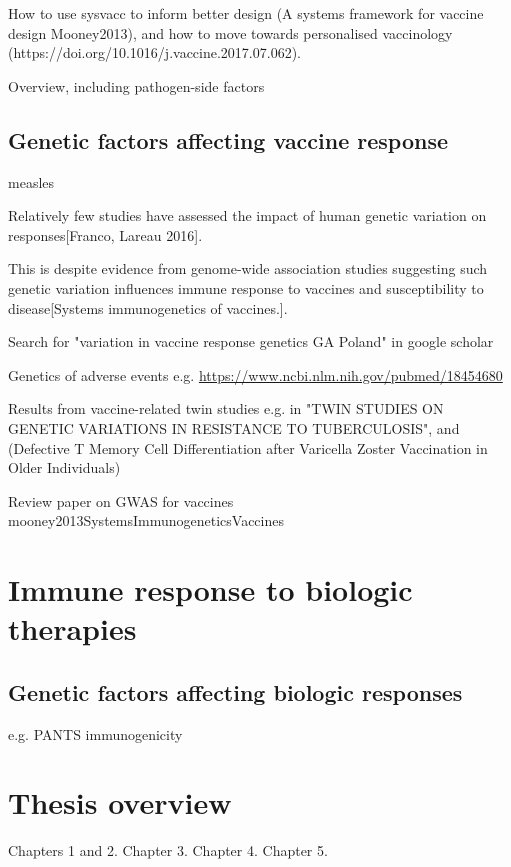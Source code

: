 How to use sysvacc to inform better design (A systems framework for vaccine design Mooney2013), and how to move towards personalised vaccinology (https://doi.org/10.1016/j.vaccine.2017.07.062).

Overview, including pathogen-side factors

\subsection{Genetic factors affecting vaccine response}


measles

Relatively few studies have assessed the impact of human genetic variation on responses[Franco, Lareau 2016].

This is despite evidence from genome-wide association studies suggesting such genetic variation influences immune response to vaccines and susceptibility to disease[Systems immunogenetics of vaccines.].

Search for "variation in vaccine response genetics GA Poland" in google scholar

Genetics of adverse events e.g. \url{https://www.ncbi.nlm.nih.gov/pubmed/18454680}

Results from vaccine-related twin studies e.g. in "TWIN STUDIES ON GENETIC VARIATIONS IN RESISTANCE TO TUBERCULOSIS", and (Defective T Memory Cell Differentiation after Varicella Zoster Vaccination in Older Individuals)

Review paper on GWAS for vaccines mooney2013SystemsImmunogeneticsVaccines

\section{Immune response to biologic therapies}

\subsection{Genetic factors affecting biologic responses}

e.g. PANTS immunogenicity

\section{Thesis overview}

Chapters 1 and 2.
Chapter 3.
Chapter 4.
Chapter 5.
